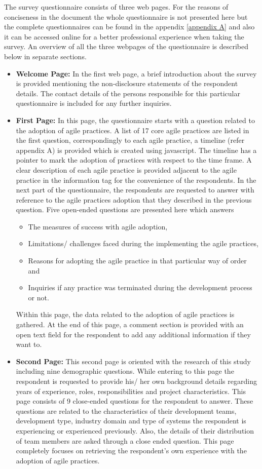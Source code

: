 \documentclass[a4paper,oneside]{bth}
\begin{document}
The survey questionnaire consists of three web pages. For the reasons of conciseness in the document the whole questionnaire is not presented here but the complete questionnaires can be found in the appendix \ref{appendix A} and also it can be accessed online for a better professional experience when taking the survey. An overview of all the three webpages of the questionnaire is described below in separate sections.
\begin{itemize}
\item \textbf{Welcome Page:} In the first web page, a brief introduction about the survey is provided mentioning the non-disclosure statements of the respondent details. The contact details of the persons responsible for this particular questionnaire is included for any further inquiries.
\item \textbf{First Page:} In this page, the questionnaire starts with a question related to the adoption of agile practices. A list of 17 core agile practices are listed in the first question, correspondingly to each agile practice, a timeline (refer appendix A) is provided which is created using javascript. The timeline has a pointer to mark the adoption of practices with respect to the time frame. A clear description of each agile practice is provided adjacent to the agile practice in the information tag for the convenience of the respondents.  In the next part of the questionnaire, the respondents are requested to answer with reference to the agile practices adoption that they described in the previous question. Five open-ended questions are presented here which answers
\begin{itemize}
\item  The measures of success with agile adoption,
\item Limitations/ challenges faced during the implementing the agile practices,
\item Reasons for adopting the agile practice in that particular way of order and
\item Inquiries if any practice was terminated during the development process or not.
\end{itemize}
Within this page, the data related to the adoption of agile practices is gathered. At the end of this page, a comment section is provided with an open text field for the respondent to add any additional information if they want to.
\item \textbf{Second Page:} This second page is oriented with the research of this study including nine demographic questions. While entering to this page the respondent is requested to provide his/ her own background details regarding years of experience, roles, responsibilities and project characteristics. This page consists of 9 close-ended questions for the respondent to answer. These questions are related to the characteristics of their development teams, development type, industry domain and type of systems the respondent is experiencing or experienced previously. Also, the details of their distribution of team members are asked through a close ended question. This page completely focuses on retrieving the respondent’s own experience with the adoption of agile practices.

\end{itemize}
\end{document}

